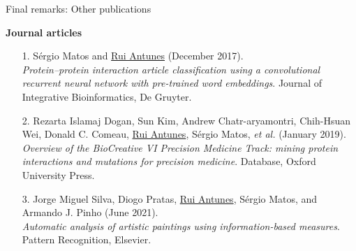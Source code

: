 \begin{frame}[t]{Final remarks: Other publications}

\vspace*{-3mm}

\newcommand{\minorscriptsize}{\fontsize{7.0pt}{8.4pt}\selectfont}

\textbf{\minorscriptsize Journal articles}


\fontsize{4.3pt}{5.16pt}\selectfont

\settowidth{\leftmargini}{7.}
\addtolength{\leftmargini}{\labelsep}


\begin{itemize}

\item[1.]
Sérgio Matos and \underline{Rui Antunes} (December 2017).\\
\textit{Protein--protein interaction article classification using a convolutional recurrent neural network with pre-trained word embeddings}.
Journal of Integrative Bioinformatics, De Gruyter.

\item[2.]
Rezarta Islamaj Dogan, Sun Kim, Andrew Chatr-aryamontri, Chih-Hsuan Wei, Donald C. Comeau, \underline{Rui Antunes}, Sérgio Matos, \textit{et al.} (January 2019).\\
\textit{Overview of the BioCreative VI Precision Medicine Track: mining protein interactions and mutations for precision medicine}.
Database, Oxford University Press.

\item[3.]
Jorge Miguel Silva, Diogo Pratas, \underline{Rui Antunes}, Sérgio Matos, and Armando J. Pinho (June 2021).\\
\textit{Automatic analysis of artistic paintings using information-based measures}.
Pattern Recognition, Elsevier.


\end{itemize}
\end{frame}

